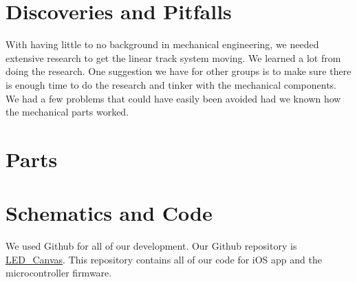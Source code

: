 \documentclass[12pt]{article}
\begin{document}
\begin{appendices}
  \section{Discoveries and Pitfalls}
  With having little to no background in mechanical engineering, we needed extensive research to get the linear track system moving. We learned a lot from doing the research. One suggestion we have for other groups is to make sure there is enough time to do the research and tinker with the mechanical components. We had a few problems that could have easily been avoided had we known how the mechanical parts worked.

  \section{Parts}

  \section{Schematics and Code}
  We used Github for all of our development. Our Github repository is \href{https://github.com/rajp20/LED_Canvas}{LED\_Canvas}. This repository contains all of our code for iOS app and the microcontroller firmware. 
\end{appendices}
\end{document}
